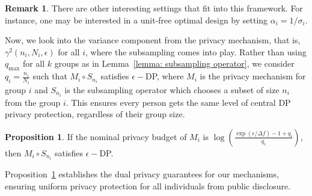 \documentclass{article}
\theoremstyle{definition}
\newtheorem{proposition}[theorem]{Proposition}
\newtheorem{remark}[theorem]{Remark}
\begin{document}
\begin{remark}
    There are other interesting settings that fit into this framework. For instance, one may be interested in a unit-free optimal design by setting $\alpha_i=1/\sigma_i$.%
\end{remark}

Now, we look into the variance component from the privacy mechanism, that is, $\gamma^2 (n_i, N_i, \epsilon)$ for all $i$, where the subsampling comes into play. Rather than using $q_{\max}$ for all $k$ groups as in Lemma~\ref{lemma: subsampling operator}, we consider $q_i = \frac{n_i}{N_i}$ such that $M_i\circ S_{n_i}$ satisfies $\epsilon-$DP, where $M_i$ is the privacy mechanism for group $i$ and $S_{n_i}$ is the subsampling operator which chooses a subset of size $n_i$ from the group $i$. This ensures every person gets the same level of central DP privacy protection, regardless of their group size. 

\begin{proposition} \label{prop: nominal epsilon for epsilon-DP}
    If the nominal privacy budget of $M_i$ is $\log \left( \frac{\exp{(\epsilon/\Delta f)} - 1 + q_i}{q_i} \right)$, then $M_i\circ S_{n_i}$ satisfies $\epsilon-$DP. 
\end{proposition}

Proposition~\ref{prop: nominal epsilon for epsilon-DP} establishes the dual privacy guarantees for our mechanisms, ensuring uniform privacy protection for all individuals from public disclosure.
\end{document}
